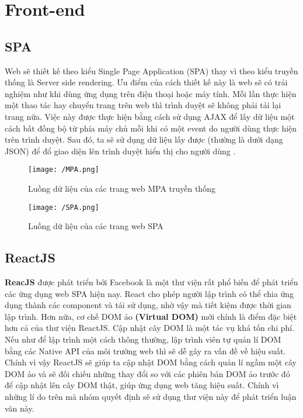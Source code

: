 \section{Front-end}
	\subsection{SPA}
		 Web sẽ thiết kế theo kiểu Single Page Application (SPA) thay vì theo kiểu truyền thống là Server side rendering. Ưu điểm của cách thiết kế này là web sẽ có trải nghiệm như khi dùng ứng dụng trên điện thoại hoặc máy tính. Mỗi lần thực hiện một thao tác hay chuyển trang trên web thì trình duyệt sẽ không phải tải lại trang nữa. Việc này được thực hiện bằng cách sử dụng AJAX để lấy dữ liệu một cách bất đồng bộ từ phía máy chủ mỗi khi có một event do người dùng thực hiện trên trình duyệt. Sau đó, ta sẽ sử dụng dữ liệu lấy được (thường là dưới dạng JSON) để đổ giao diện lên trình duyệt hiển thị cho người dùng \cite{SPAMPA}.
		 
		 \begin{figure}[H]
		 	\texttt{[image: /MPA.png]}
		 	\centering
		 	\linebreak
		 	\caption{Luồng dữ liệu của các trang web MPA truyền thống}
		 \end{figure}
		 
		 \begin{figure}[H]
		 	\texttt{[image: /SPA.png]}
		 	\centering
		 	\linebreak
		 	\caption{Luồng dữ liệu của các trang web SPA}
		 \end{figure}
    
	\subsection{ReactJS}
		\textbf{ReacJS} \cite{ReactJS} được phát triển bởi Facebook là một thư viện rất phổ biến để phát triển các ứng dụng web SPA hiện nay. React cho phép người lập trình có thể chia ứng dụng thành các component và tái sử dụng, nhờ vậy mà tiết kiệm được thời gian lập trình. Hơn nữa, cơ chế DOM ảo \textbf{(Virtual DOM)} mới chính là điểm đặc biệt hơn cả của thư viện ReactJS. Cập nhật cây DOM là một tác vụ khá tốn chi phí. Nếu như để lập trình một cách thông thường, lập trình viên tự quản lí DOM bằng các Native API của môi trường web thì sẽ dễ gây ra vấn đề về hiệu suất. Chính vì vậy ReactJS sẽ giúp ta cập nhật DOM bằng cách quản lí ngầm một cây DOM ảo và sẽ đối chiếu những thay đổi so với các phiên bản DOM ảo trước đó để cập nhật lên cây DOM thật, giúp ứng dụng web tăng hiệu suất. Chính vì những lí do trên mà nhóm quyết định sẽ sử dụng thư viện này để phát triển luận văn này.\\
		
